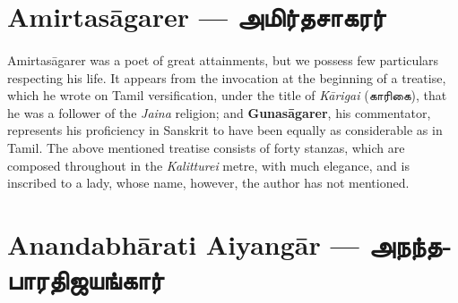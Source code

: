 \documentclass{article}
\newcommand{\TamilText}[1]{\texttamil{#1}}
\newcommand{\TamilBold}[1]{\texttamil{\textbf{#1}}}
\newcommand{\tam}[1]{\TamilText{#1}}
\newcommand{\tambold}[1]{\TamilBold{#1}}
\begin{document}
\section{Amirtas\={a}garer --- \tambold{அமிர்தசாகரர்}}
\paragraph{}
Amirtas\={a}garer was a poet of great attainments, but we possess few particulars respecting his life. It appears from the invocation at the beginning of a treatise, which he wrote on Tamil versification, under the title of \emph{K\={a}rigai} (\tam{காரிகை}), that he was a follower of the \emph{Jaina} religion; and \textbf{Gunas\={a}garer}, his commentator, represents his proficiency in Sanskrit to have been equally as considerable as in Tamil. The above mentioned treatise consists of forty stanzas, which are composed throughout in the \emph{Kalitturei} metre, with much elegance, and is inscribed to a lady, whose name, however, the author has not mentioned.

\section{Anandabh\={a}rati Aiyang\={a}r --- \tambold{அநந்தபாரதிஜயங்கார்}}
\end{document}
